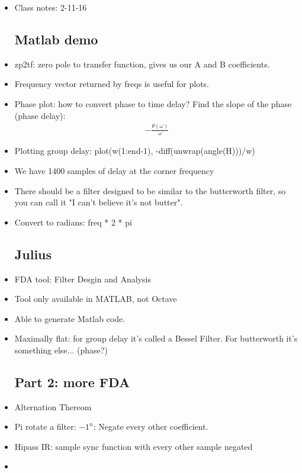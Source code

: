 \begin{itemize}
\item{Class notes: 2-11-16}
\subsection*{Matlab demo}

\item{
zp2tf: zero pole to transfer function, gives us our A and B coefficients.
}

\item{
Frequency vector returned by freqs is useful for plots. 
}

\item{
Phase plot: how to convert phase to time delay? Find the slope of the phase (phase delay):
\begin{align*}
-\frac{\theta(\omega)}{\omega}
\end{align*} 
}

\item{
Plotting group delay: plot(w(1:end-1), -diff(unwrap(angle(H)))/w)
}

\item{
We have 1400 samples of delay at the corner frequency
}

\item{
There should be a filter designed to be similar to the butterworth filter, so you can
call it "I can't believe it's not butter".
}

\item{
Convert to radians: freq * 2 * pi
}

\subsection*{Julius}
\item{
FDA tool: Filter Desgin and Analysis
}

\item{
Tool only available in MATLAB, not Octave
}

\item{
Able to generate Matlab code.
}

\item{
Maximally flat: for group delay it's called a Bessel Filter. For butterworth it's something else... (phase?)
}

\subsection*{Part 2: more FDA}
\item{
Alternation Thereom
}

\item{
Pi rotate a filter: $-1^{n}$: Negate every other coefficient.
}

\item{
Hipass IR: sample sync function with every other sample negated
}

\item{

}

\end{itemize}
